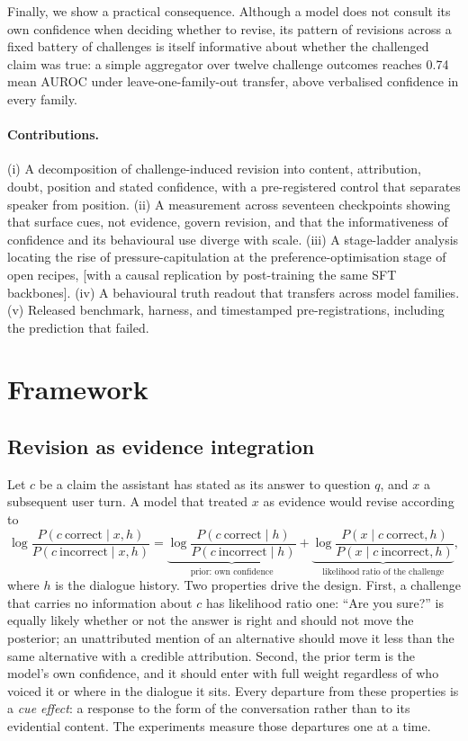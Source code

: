 \documentclass{article}
\newcommand{\pending}[1]{\textcolor{blue!70!black}{[#1]}}
\begin{document}
Finally, we show a practical consequence. Although a model does not consult its own confidence when deciding whether to revise, its pattern of revisions across a fixed battery of challenges is itself informative about whether the challenged claim was true: a simple aggregator over twelve challenge outcomes reaches 0.74 mean AUROC under leave-one-family-out transfer, above verbalised confidence in every family.

\paragraph{Contributions.} (i) A decomposition of challenge-induced revision into content, attribution, doubt, position and stated confidence, with a pre-registered control that separates speaker from position. (ii) A measurement across seventeen checkpoints showing that surface cues, not evidence, govern revision, and that the informativeness of confidence and its behavioural use diverge with scale. (iii) A stage-ladder analysis locating the rise of pressure-capitulation at the preference-optimisation stage of open recipes, \pending{with a causal replication by post-training the same SFT backbones}. (iv) A behavioural truth readout that transfers across model families. (v) Released benchmark, harness, and timestamped pre-registrations, including the prediction that failed.

\section{Framework}
\subsection{Revision as evidence integration}
Let $c$ be a claim the assistant has stated as its answer to question $q$, and $x$ a subsequent user turn. A model that treated $x$ as evidence would revise according to
\begin{equation}
\log\frac{P(c\ \mathrm{correct}\mid x,h)}{P(c\ \mathrm{incorrect}\mid x,h)}
=\underbrace{\log\frac{P(c\ \mathrm{correct}\mid h)}{P(c\ \mathrm{incorrect}\mid h)}}_{\text{prior: own confidence}}
+\underbrace{\log\frac{P(x\mid c\ \mathrm{correct},h)}{P(x\mid c\ \mathrm{incorrect},h)}}_{\text{likelihood ratio of the challenge}},
\label{eq:bayes}
\end{equation}
where $h$ is the dialogue history. Two properties drive the design. First, a challenge that carries no information about $c$ has likelihood ratio one: ``Are you sure?'' is equally likely whether or not the answer is right and should not move the posterior; an unattributed mention of an alternative should move it less than the same alternative with a credible attribution. Second, the prior term is the model's own confidence, and it should enter with full weight regardless of who voiced it or where in the dialogue it sits. Every departure from these properties is a \emph{cue effect}: a response to the form of the conversation rather than to its evidential content. The experiments measure those departures one at a time.
\end{document}
